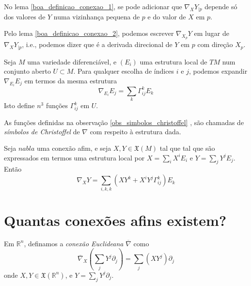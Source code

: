 \begin{lema}\label{boa_definicao_conexao_2}
	No lema \ref{boa_definicao_conexao_1}, se pode adicionar que $\nabla_X Y_{|p}$ depende só dos valores de $Y$ numa vizinhança pequena de $p$ e do valor de $X$ em $p$.
\end{lema}

\begin{observacao}
	Pelo lema \ref{boa_definicao_conexao_2}, podemos escrever $\nabla_{X_p} Y$ em lugar de $\nabla_X Y_{|p}$, i.e., podemos dizer que é a derivada direcional de $Y$ em $p$ com direção $X_p$.
\end{observacao}

\begin{observacao}\label{obs_simbolos_christoffel}
	Seja $M$ uma variedade diferenciável, e $(E_i)$ uma estrutura local de $TM$ num conjunto aberto $U \subset M$. Para qualquer escolha de índices $i$ e $j$, podemos expandir $\nabla_{E_i} E_j$ em termos da mesma estrutura
	\begin{equation*}
		\nabla_{E_i} E_j = \sum_k \Gamma^k_{ij} E_k
	\end{equation*}
	Isto define $n^3$ funções $\Gamma^k_{ij}$ em $U$.
\end{observacao}

\begin{definicao} 
	As funções definidas na observação \ref{obs_simbolos_christoffel} , são chamadas de \emph{símbolos de Christoffel} de $\nabla$ com respeito à estrutura dada.
\end{definicao}

\begin{lema}
	Seja $nabla$ uma conexão afim, e seja $X,Y \in \mathfrak{X}(M)$ tal que tal que são expressados em termos uma estrutura local por $X = \sum_i X^i E_i$ e $Y = \sum_j Y^j E_j$. Então
	\begin{equation*}
		\nabla_X Y = \sum_{i,k,k} \left( X Y^k + X^i Y^j \Gamma^k_{ij} \right) E_k
	\end{equation*}
\end{lema}

\section{Quantas conexões afins existem?}

\begin{definicao}
	Em $\mathbb{R}^n$, definamos a \emph{conexão Euclideana} $\overline{\nabla}$ como
	\begin{equation*}
		\overline{\nabla}_X \left( \sum_j Y^j \partial_j \right) = \sum_j \left( X Y^j \right) \partial_j
	\end{equation*}
	onde $X,Y \in \mathfrak{X}(\mathbb{R}^n)$, e $Y = \sum_j Y^j \partial_j$.
\end{definicao}

